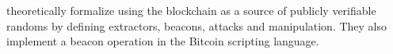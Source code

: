 \item[On Bitcoin as a Source of Public Randomness]
\citet{bonneau2015bitcoin} theoretically formalize using the blockchain as a source of publicly verifiable randoms by defining extractors, beacons, attacks and manipulation. They also implement a beacon operation in the Bitcoin scripting language.  